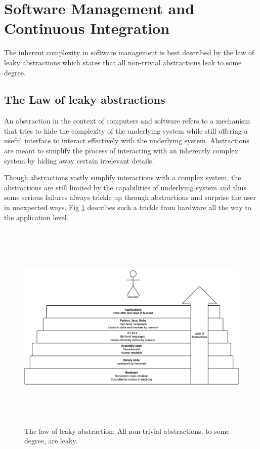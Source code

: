 \documentclass[12pt,conference]{IEEEtran}
\begin{document}
\section*{Software Management and Continuous Integration}

The inherent complexity in software management is best described by the law of leaky abstractions \cite{spolsky_law_2002} which states that all non-trivial abstractions leak to some degree. 

\subsection*{The Law of leaky abstractions}

An abstraction in the context of computers and software refers to a mechanism that tries to hide the complexity of the underlying system while still offering a useful interface to interact effectively with the underlying system. Abstractions are meant to simplify the process of interacting with an inherently complex system by hiding away certain irrelevant details.

Though abstractions vastly simplify interactions with a complex system, the abstractions are still limited by the capabilities of underlying system and  thus some serious failures always trickle up through abstractions and surprise the user in unexpected ways. Fig \ref{leakyabstraction} describes such a trickle from hardware all the way to the application level.

\begin{figure}
  \centering
  \includegraphics[height=4in]{leakyabstraction}
  \caption{The law of leaky abstraction: All non-trivial abstractions, to some degree, are leaky.}
  \label{leakyabstraction}
\end{figure}
\end{document}
